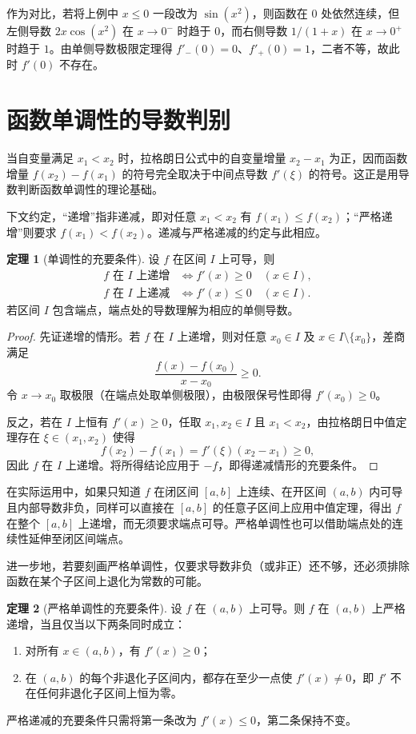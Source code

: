 \documentclass[UTF8,fontset=fandol,a4paper,12pt]{ctexart}
\theoremstyle{definition}
\newtheorem{theorem}{定理}[section]
\begin{document}
作为对比，若将上例中 $x\le0$ 一段改为 $\sin(x^2)$，则函数在 $0$ 处依然连续，但左侧导数 $2x\cos(x^2)$ 在 $x\to0^-$ 时趋于 $0$，而右侧导数 $1/(1+x)$ 在 $x\to0^+$ 时趋于 $1$。由单侧导数极限定理得 $f'_-(0)=0$、$f'_+(0)=1$，二者不等，故此时 $f'(0)$ 不存在。

\section{函数单调性的导数判别}
当自变量满足 $x_1<x_2$ 时，拉格朗日公式中的自变量增量 $x_2-x_1$ 为正，因而函数增量 $f(x_2)-f(x_1)$ 的符号完全取决于中间点导数 $f'(\xi)$ 的符号。这正是用导数判断函数单调性的理论基础。

下文约定，“递增”指非递减，即对任意 $x_1<x_2$ 有 $f(x_1)\le f(x_2)$；“严格递增”则要求 $f(x_1)<f(x_2)$。递减与严格递减的约定与此相应。

\begin{theorem}[单调性的充要条件]
设 $f$ 在区间 $I$ 上可导，则
\[
 \begin{aligned}
 f\text{ 在 }I\text{ 上递增}&\iff f'(x)\ge0\quad(x\in I),\\
 f\text{ 在 }I\text{ 上递减}&\iff f'(x)\le0\quad(x\in I).
 \end{aligned}
\]
若区间 $I$ 包含端点，端点处的导数理解为相应的单侧导数。
\end{theorem}

\begin{proof}
先证递增的情形。若 $f$ 在 $I$ 上递增，则对任意 $x_0\in I$ 及 $x\in I\setminus\{x_0\}$，差商满足
\[
 \frac{f(x)-f(x_0)}{x-x_0}\ge0.
\]
令 $x\to x_0$ 取极限（在端点处取单侧极限），由极限保号性即得 $f'(x_0)\ge0$。

反之，若在 $I$ 上恒有 $f'(x)\ge0$，任取 $x_1,x_2\in I$ 且 $x_1<x_2$，由拉格朗日中值定理存在 $\xi\in(x_1,x_2)$ 使得
\[
 f(x_2)-f(x_1)=f'(\xi)(x_2-x_1)\ge0,
\]
因此 $f$ 在 $I$ 上递增。将所得结论应用于 $-f$，即得递减情形的充要条件。
\end{proof}

在实际运用中，如果只知道 $f$ 在闭区间 $[a,b]$ 上连续、在开区间 $(a,b)$ 内可导且内部导数非负，同样可以直接在 $[a,b]$ 的任意子区间上应用中值定理，得出 $f$ 在整个 $[a,b]$ 上递增，而无须要求端点可导。严格单调性也可以借助端点处的连续性延伸至闭区间端点。

进一步地，若要刻画严格单调性，仅要求导数非负（或非正）还不够，还必须排除函数在某个子区间上退化为常数的可能。

\begin{theorem}[严格单调性的充要条件]
设 $f$ 在 $(a,b)$ 上可导。则 $f$ 在 $(a,b)$ 上严格递增，当且仅当以下两条同时成立：
\begin{enumerate}
\item 对所有 $x\in(a,b)$，有 $f'(x)\ge0$；
\item 在 $(a,b)$ 的每个非退化子区间内，都存在至少一点使 $f'(x)\ne0$，即 $f'$ 不在任何非退化子区间上恒为零。
\end{enumerate}
严格递减的充要条件只需将第一条改为 $f'(x)\le0$，第二条保持不变。
\end{theorem}
\end{document}

